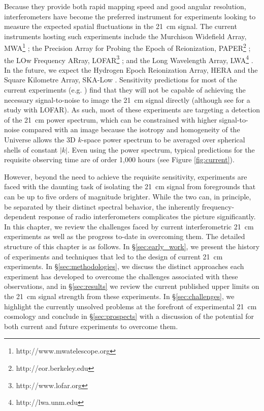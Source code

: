 Because they provide both rapid mapping speed and good angular resolution, interferometers have become the preferred instrument for experiments looking to measure the expected spatial fluctuations in the 21~cm signal.
The current instruments hosting such experiments include the Murchison Widefield Array, MWA{\footnote[1]{http://www.mwatelescope.org}} \cite{bowman13_mwascience,tingay13_mwasystem,jacobs16}; the Precision Array for Probing the Epoch of Reionization, PAPER{\footnote[2]{http://eor.berkeley.edu}} \cite{parsons10}; the LOw Frequency ARray, LOFAR{\footnote[3]{http://www.lofar.org}} \cite{vanhaarlem13,patil16}; and the Long Wavelength Array, LWA{\footnote[4]{http://lwa.unm.edu}} \cite{ellingson09}. In the future, we expect the Hydrogen Epoch Reionization Array, HERA \cite{deboer16} and the Square Kilometre Array, SKA-Low \cite{koopmans15}.
Sensitivity predictions for most of the current experiments (e.g. \cite{beardsley13,pober14}) find that they will not be capable of achieving the necessary signal-to-noise to image the 21~cm signal directly (although see \cite{2012MNRAS.425.2964Z} for a study with LOFAR).  As such, most of these experiments are targeting a detection of the 21~cm power spectrum, which can be constrained with higher signal-to-noise compared with an image because the isotropy and homogeneity of the Universe allows the 3D $k$-space power spectrum to be averaged over spherical shells of constant $|k|$.
Even using the power spectrum, typical predictions for the requisite observing time are of order 1,000 hours (see Figure \ref{fig:current}).

However, beyond the need to achieve the requisite sensitivity, experiments are faced with the daunting task of isolating the 21~cm signal from foregrounds that can be up to five orders of magnitude brighter.  While the two can, in principle, be separated by their distinct spectral behavior, the inherently frequency-dependent response of radio interferometers complicates the picture significantly.  In this chapter, we review the challenges faced by current interferometric 21~cm experiments as well as the progress to-date in overcoming them.  The detailed structure of this chapter is as follows.  In \S\ref{sec:early_work}, we present the history of experiments and techniques that led to the design of current 21~cm experiments.  In \S\ref{sec:methodologies}, we discuss the distinct approaches each experiment has developed to overcome the challenges associated with these observations, and in \S\ref{sec:results} we review the current published upper limits on the 21~cm signal strength from these experiments.  In \S\ref{sec:challenges}, we highlight the currently unsolved problems at the forefront of experimental 21~cm cosmology and conclude in \S\ref{sec:prospects} with a discussion of the potential for both current and future experiments to overcome them.


